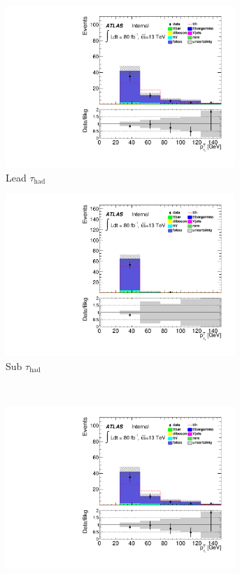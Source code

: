 \begin{figure}[h]\ContinuedFloat
\centering
\begin{subfigure}[b]{0.45\textwidth}
 \includegraphics[width=0.95\textwidth,angle=-90]{fig/lowBDTOSFakes/tau_pt_0_F.pdf}
 \caption{Lead $\tau_{\text{had}}$ \pt}
\end{subfigure}
\begin{subfigure}[b]{0.45\textwidth}
 \includegraphics[width=0.95\textwidth,angle=-90]{fig/lowBDTOSFakes/tau_pt_1_F.pdf}
 \caption{Sub $\tau_{\text{had}}$ \pt}
\end{subfigure}\\
\begin{subfigure}[b]{0.45\textwidth}
 \includegraphics[width=0.95\textwidth,angle=-90]{fig/lowBDTOSFakes/tau_pt_0_F.pdf}

\end{subfigure}
\end{figure}
